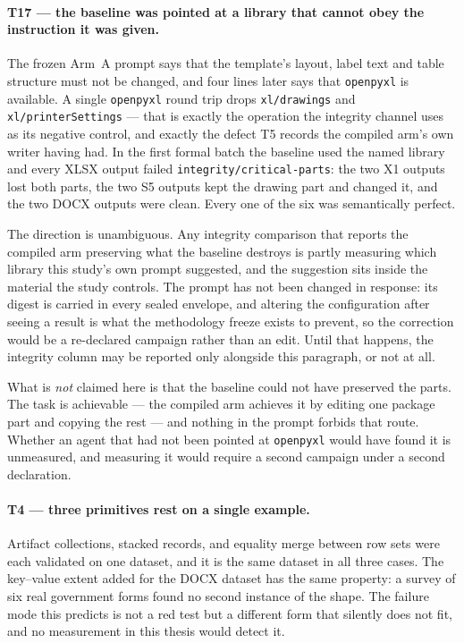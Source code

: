 \paragraph{T17 --- the baseline was pointed at a library that cannot obey the instruction it
was given.}
The frozen Arm~A prompt says that the template's layout, label text and table structure must
not be changed, and four lines later says that \texttt{openpyxl} is available. A single
\texttt{openpyxl} round trip drops \texttt{xl/drawings} and \texttt{xl/printerSettings} ---
that is exactly the operation the integrity channel uses as its negative control, and exactly
the defect T5 records the compiled arm's own writer having had. In the first formal batch the
baseline used the named library and every XLSX output failed
\texttt{integrity/critical-parts}: the two X1 outputs lost both parts, the two S5 outputs kept
the drawing part and changed it, and the two DOCX outputs were clean. Every one of the six was
semantically perfect.

The direction is unambiguous. Any integrity comparison that reports the compiled arm preserving
what the baseline destroys is partly measuring which library this study's own prompt suggested,
and the suggestion sits inside the material the study controls. The prompt has not been changed
in response: its digest is carried in every sealed envelope, and altering the configuration
after seeing a result is what the methodology freeze exists to prevent, so the correction would
be a re-declared campaign rather than an edit. Until that happens, the integrity column may be
reported only alongside this paragraph, or not at all.

What is \emph{not} claimed here is that the baseline could not have preserved the parts. The
task is achievable --- the compiled arm achieves it by editing one package part and copying the
rest --- and nothing in the prompt forbids that route. Whether an agent that had not been
pointed at \texttt{openpyxl} would have found it is unmeasured, and measuring it would require
a second campaign under a second declaration.

\paragraph{T4 --- three primitives rest on a single example.}
Artifact collections, stacked records, and equality merge between row sets were each validated
on one dataset, and it is the same dataset in all three cases. The key--value extent added for
the DOCX dataset has the same property: a survey of six real government forms found no second
instance of the shape. The failure mode this predicts is not a red test but a different form
that silently does not fit, and no measurement in this thesis would detect it.


